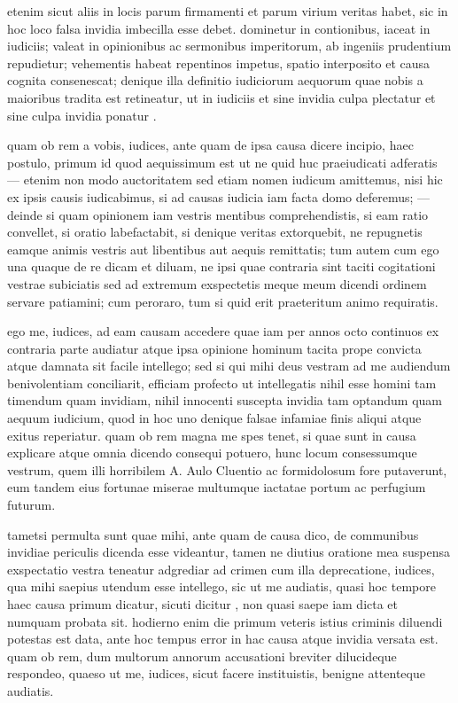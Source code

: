  etenim sicut aliis in locis parum firmamenti et parum virium veritas habet, sic in hoc loco falsa invidia imbecilla esse debet. dominetur in contionibus, iaceat in iudiciis; valeat in opinionibus ac sermonibus imperitorum, ab ingeniis prudentium repudietur; vehementis habeat repentinos impetus, spatio interposito et causa cognita consenescat; denique illa definitio iudiciorum aequorum quae nobis a maioribus tradita est retineatur, ut in iudiciis et sine invidia culpa plectatur et sine culpa invidia ponatur .

 quam ob rem a vobis, iudices, ante quam de ipsa causa dicere incipio, haec postulo, primum id quod aequissimum est ut ne quid huc praeiudicati adferatis — etenim non modo auctoritatem sed etiam nomen iudicum amittemus, nisi hic ex ipsis causis iudicabimus, si ad causas iudicia iam facta domo deferemus; — deinde si quam opinionem iam vestris mentibus comprehendistis, si eam ratio convellet, si oratio labefactabit, si denique veritas extorquebit, ne repugnetis eamque animis vestris aut libentibus aut aequis remittatis; tum autem cum ego una quaque de re dicam et diluam, ne ipsi quae contraria sint taciti cogitationi vestrae subiciatis sed ad extremum exspectetis meque meum dicendi ordinem servare patiamini; cum peroraro, tum si quid erit praeteritum animo requiratis.

 ego me, iudices, ad eam causam accedere quae iam per annos octo continuos ex contraria parte audiatur atque ipsa opinione hominum tacita prope convicta atque damnata sit facile intellego; sed si qui mihi deus vestram ad me audiendum benivolentiam conciliarit, efficiam profecto ut intellegatis nihil esse homini tam timendum quam invidiam, nihil innocenti suscepta invidia tam optandum quam aequum iudicium, quod in hoc uno denique falsae infamiae finis aliqui atque exitus reperiatur. quam ob rem magna me spes tenet, si quae sunt in causa explicare atque omnia dicendo consequi potuero, hunc locum consessumque vestrum, quem illi horribilem A. Aulo Cluentio ac formidolosum fore putaverunt, eum tandem eius fortunae miserae multumque iactatae portum ac perfugium futurum.

 tametsi permulta sunt quae mihi, ante quam de causa dico, de communibus invidiae periculis dicenda esse videantur, tamen ne diutius oratione mea suspensa exspectatio vestra teneatur adgrediar ad crimen cum illa deprecatione, iudices, qua mihi saepius utendum esse intellego, sic ut me audiatis, quasi hoc tempore haec causa primum dicatur, sicuti dicitur , non quasi saepe iam dicta et numquam probata sit. hodierno enim die primum veteris istius criminis diluendi potestas est data, ante hoc tempus error in hac causa atque invidia versata est. quam ob rem, dum multorum annorum accusationi breviter dilucideque respondeo, quaeso ut me, iudices, sicut facere instituistis, benigne attenteque audiatis.

